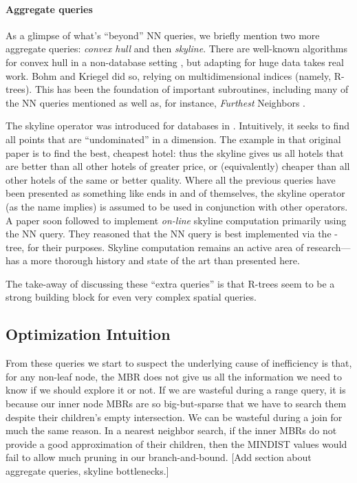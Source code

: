 \paragraph{Aggregate queries}
As a glimpse of what's ``beyond'' NN queries, we briefly mention two more aggregate queries: \emph{convex hull} and then \emph{skyline}.
There are well-known algorithms for convex hull in a non-database setting \cite{clrs3rd}, but adapting for huge data takes real work.
Bohm and Kriegel \cite{bohmkriegel01} did so, relying on multidimensional indices (namely, R-trees).
This has been the foundation of important subroutines, including many of the NN queries mentioned as well as, for instance, \emph{Furthest} Neighbors \cite{yaolikumar09}.

The skyline operator was introduced for databases in \cite{borzsonyikossmanstocker01}.
Intuitively, it seeks to find all points that are ``undominated'' in a dimension.
The example in that original paper is to find the best, cheapest hotel: thus the skyline gives us all hotels that are better than all other hotels of greater price, or (equivalently) cheaper than all other hotels of the same or better quality.
Where all the previous queries have been presented as something like ends in and of themselves, the skyline operator (as the name implies) is assumed to be used in conjunction with other operators.
A paper soon followed to implement \emph{on-line} skyline computation primarily using the NN query\cite{kossmanramsakrost02}.
They reasoned that the NN query is best implemented via the \rstar-tree, for their purposes.
Skyline computation remains an active area of research---\cite{zhangalhajj09} has a more thorough history and state of the art than presented here.

The take-away of discussing these ``extra queries'' is that R-trees seem to be a strong building block for even very complex spatial queries.

\subsection{Optimization Intuition}

From these queries we start to suspect the underlying cause of inefficiency is that, for any non-leaf node, the MBR does not give us all the information we need to know if we should explore it or not.
If we are wasteful during a range query, it is because our inner node MBRs are so big-but-sparse that we have to search them despite their children's empty intersection.
We can be wasteful during a join for much the same reason.
In a nearest neighbor search, if the inner MBRs do not provide a good approximation of their children, then the MINDIST values would fail to allow much pruning in our branch-and-bound.
[Add section about aggregate queries, skyline bottlenecks.]

